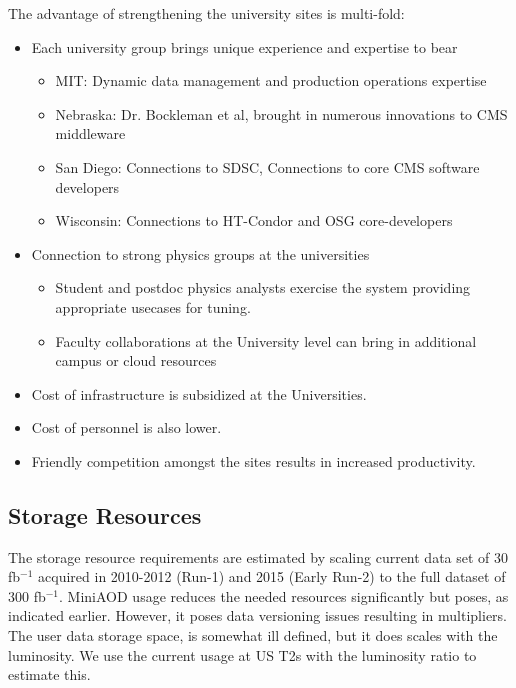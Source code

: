 The advantage of strengthening the university sites is multi-fold:
\begin{itemize}
\item Each university group brings unique experience and expertise to bear
\begin{itemize}
\item MIT: Dynamic data management and production operations expertise
\item Nebraska: Dr. Bockleman et al, brought in numerous innovations to CMS middleware
\item San Diego: Connections to SDSC, Connections to core CMS software developers
\item Wisconsin: Connections to HT-Condor and OSG core-developers
\end{itemize}
\item Connection to strong physics groups at the universities
\begin{itemize}
\item Student and postdoc physics analysts exercise the system providing
appropriate usecases for tuning. 
\item Faculty collaborations at the University level can bring in additional
campus or cloud resources
\end{itemize}
\item Cost of infrastructure is subsidized at the Universities.
\item Cost of personnel is also lower.
\item Friendly competition amongst the sites results in increased productivity.
\end{itemize}

\subsection{Storage Resources}

The storage resource requirements are estimated by scaling current data set 
of 30 fb$^{-1}$ acquired in 2010-2012 (Run-1) and 2015 (Early Run-2) to the
full dataset of 300 fb$^{-1}$.  MiniAOD usage reduces the needed resources
significantly but poses, as indicated earlier.  However, it poses data versioning
issues resulting in multipliers.  The user data storage space, is somewhat
ill defined, but it does scales with the luminosity. We use the current usage
at US T2s with the luminosity ratio to estimate this.  

